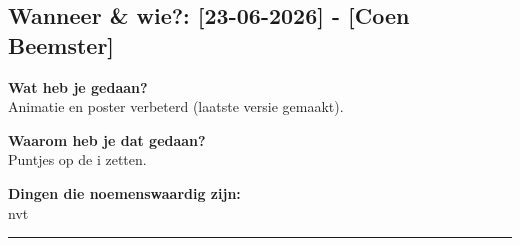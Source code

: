 
\subsection*{Wanneer \& wie?: [23-06-2026] - [Coen Beemster]}

\textbf{Wat heb je gedaan?}\\
Animatie en poster verbeterd (laatste versie gemaakt).
\vspace{0.3cm} 

\noindent \textbf{Waarom heb je dat gedaan?}\\
Puntjes op de i zetten.

\noindent \textbf{Dingen die noemenswaardig zijn:}\\
nvt


\vspace{0.5cm}
\hrule 
\vspace{0.5cm}
